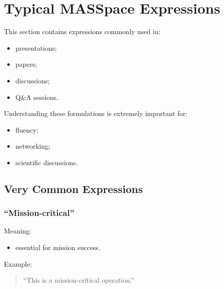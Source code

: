 \documentclass[10pt,a4paper,twocolumn]{article}
\begin{document}


\section{Typical MASSpace Expressions}

This section contains expressions commonly used in:
\begin{itemize}
    \item presentations;
    \item papers;
    \item discussions;
    \item Q\&A sessions.
\end{itemize}

Understanding these formulations is extremely important for:
\begin{itemize}
    \item fluency;
    \item networking;
    \item scientific discussions.
\end{itemize}


\subsection{Very Common Expressions}


\subsubsection*{``Mission-critical''}

Meaning:
\begin{itemize}
    \item essential for mission success.
\end{itemize}

Example:
\begin{quote}
    ``This is a mission-critical operation.''
\end{quote}

\end{document}
